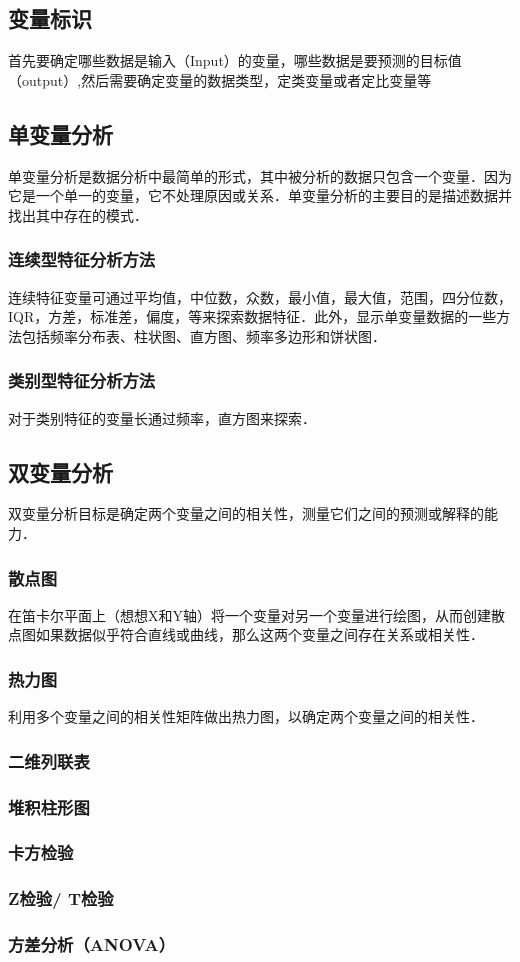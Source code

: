 \subsection{变量标识}
首先要确定哪些数据是输入（Input）的变量，哪些数据是要预测的目标值（output）,然后需要确定变量的数据类型，定类变量或者定比变量等
\subsection{单变量分析}
单变量分析是数据分析中最简单的形式，其中被分析的数据只包含一个变量．因为它是一个单一的变量，它不处理原因或关系．单变量分析的主要目的是描述数据并找出其中存在的模式．  
\subsubsection{连续型特征分析方法}
连续特征变量可通过平均值，中位数，众数，最小值，最大值，范围，四分位数，IQR，方差，标准差，偏度，等来探索数据特征．此外，显示单变量数据的一些方法包括频率分布表、柱状图、直方图、频率多边形和饼状图．
\subsubsection{类别型特征分析方法}
对于类别特征的变量长通过频率，直方图来探索．
\subsection{双变量分析}
双变量分析目标是确定两个变量之间的相关性，测量它们之间的预测或解释的能力．
\subsubsection{散点图}
在笛卡尔平面上（想想X和Y轴）将一个变量对另一个变量进行绘图，从而创建散点图如果数据似乎符合直线或曲线，那么这两个变量之间存在关系或相关性．

\subsubsection{热力图}
利用多个变量之间的相关性矩阵做出热力图，以确定两个变量之间的相关性．
\subsubsection{二维列联表}
\subsubsection{堆积柱形图}
\subsubsection{卡方检验}
\subsubsection{Z检验/ T检验}
\subsubsection{方差分析（ANOVA）}
